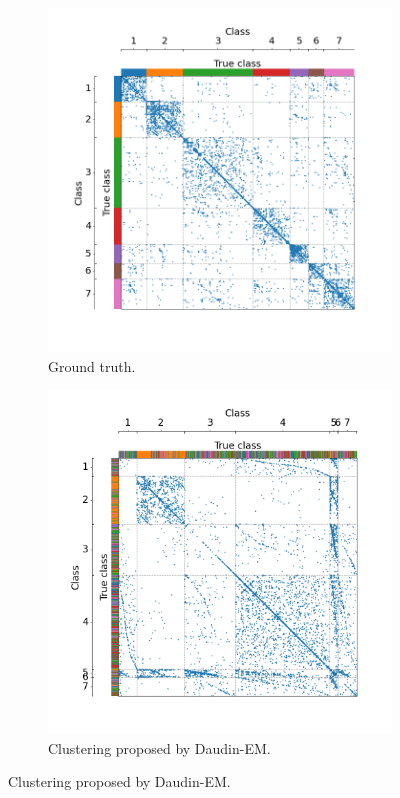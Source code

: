 \documentclass[switch, 12pt]{article}
\begin{document}
\begin{figure}[H]
    \centering
    \hfill
    \begin{subfigure}{0.45\linewidth}
        \centering
        \includegraphics[width=\linewidth, trim={45 25 35 40}, clip]{figures/cora_gt.png}
        \caption{Ground truth.}
        \label{fig:cora_gt}
    \end{subfigure}
    \hfill
    \begin{subfigure}{0.45\linewidth}
        \centering
        \includegraphics[width=\linewidth, trim={45 25 35 40}, clip]{figures/cora_sbm.png}
        \caption{Clustering proposed by Daudin-EM.}
        \label{fig:cora_SBM}
    \end{subfigure}
    \hfill


\end{figure}
\end{document}
